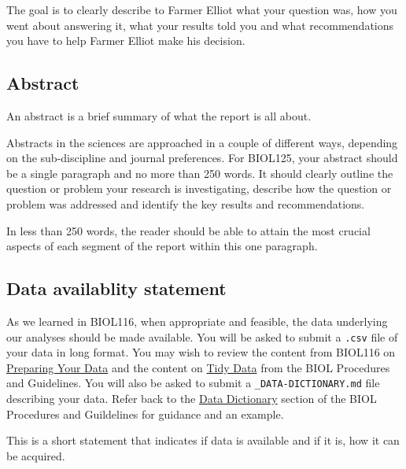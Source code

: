 \documentclass[
]{book}
\begin{document}
The goal is to clearly describe to Farmer Elliot what your question was, how you went about answering it, what your results told you and what recommendations you have to help Farmer Elliot make his decision.

\hypertarget{abstract}{%
\subsection*{Abstract}\label{abstract}}

An abstract is a brief summary of what the report is all about.

Abstracts in the sciences are approached in a couple of different ways, depending on the sub-discipline and journal preferences. For BIOL125, your abstract should be a single paragraph and no more than 250 words. It should clearly outline the question or problem your research is investigating, describe how the question or problem was addressed and identify the key results and recommendations.

In less than 250 words, the reader should be able to attain the most crucial aspects of each segment of the report within this one paragraph.

\hypertarget{data-availablity-statement}{%
\subsection*{Data availablity statement}\label{data-availablity-statement}}

As we learned in BIOL116, when appropriate and feasible, the data underlying our analyses should be made available. You will be asked to submit a \texttt{.csv} file of your data in long format. You may wish to review the content from BIOL116 on \href{https://ubco-biology.github.io/BIOL-116-Lab-Manual/preparing-your-data.html}{Preparing Your Data} and the content on \href{https://ubco-biology.github.io/Procedures-and-Guidelines/tidy-data.html}{Tidy Data} from the BIOL Procedures and Guidelines. You will also be asked to submit a \texttt{\_DATA-DICTIONARY.md} file describing your data. Refer back to the \href{https://ubco-biology.github.io/Procedures-and-Guidelines/data-dictionary.html}{Data Dictionary} section of the BIOL Procedures and Guildelines for guidance and an example.

This is a short statement that indicates if data is available and if it is, how it can be acquired.
\end{document}
